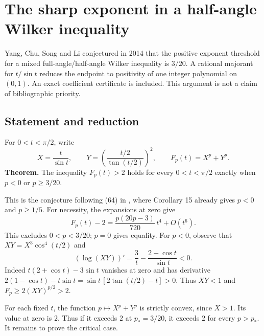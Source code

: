 \documentclass[11pt,a4paper]{article}
\numberwithin{equation}{section}
\theoremstyle{definition}
\theoremstyle{remark}
\newenvironment{sectionabstract}{\par\smallskip\begingroup\small\noindent}{\par\endgroup\medskip}
\begin{document}
\par\endgroup

\begingroup

\section{\texorpdfstring{The sharp exponent in a half-angle Wilker inequality}{The sharp exponent in a half-angle Wilker inequality}}\label{section:r26keio}
\par\medskip


\begin{sectionabstract}
Yang, Chu, Song and Li conjectured in 2014 that the positive exponent threshold for a mixed full-angle/half-angle Wilker inequality is $3/20$. A rational majorant for $t/\sin t$ reduces the endpoint to positivity of one integer polynomial on $(0,1)$. An exact coefficient certificate is included. This argument is not a claim of bibliographic priority.
\end{sectionabstract}
\subsection{Statement and reduction}
For $0<t<\pi/2$, write
\[
 X=\frac{t}{\sin t},\qquad Y=\left(\frac{t/2}{\tan(t/2)}\right)^2,
 \qquad F_p(t)=X^p+Y^p.
\]
\textbf{Theorem.} The inequality $F_p(t)>2$ holds for every $0<t<\pi/2$ exactly when $p<0$ or $p\ge 3/20$.

This is the conjecture following (64) in \cite{r26keio:Y}, where Corollary 15 already gives $p<0$ and $p\ge 1/5$. For necessity, the expansions at zero give
\[
 F_p(t)-2=\frac{p(20p-3)}{720}\,t^4+O(t^6).
\]
This excludes $0<p<3/20$; $p=0$ gives equality. For $p<0$, observe that $XY=X^3\cos^4(t/2)$ and
\[
 (\log(XY))'=\frac3t-\frac{2+\cos t}{\sin t}<0.
\]
Indeed $t(2+\cos t)-3\sin t$ vanishes at zero and has derivative
$2(1-\cos t)-t\sin t=\sin t\,[2\tan(t/2)-t]>0$. Thus $XY<1$ and $F_p\ge 2(XY)^{p/2}>2$.

For each fixed $t$, the function $p\mapsto X^p+Y^p$ is strictly convex, since $X>1$. Its value at zero is $2$. Thus if it exceeds $2$ at $p_*=3/20$, it exceeds $2$ for every $p>p_*$. It remains to prove the critical case.
\end{document}
